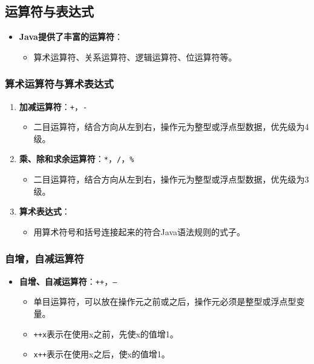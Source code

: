 \documentclass[a4paper, 10pt]{ctexart}
\begin{document}
\subsection{运算符与表达式}
\begin{itemize}
  \item \textbf{Java提供了丰富的运算符}：
  \begin{itemize}
    \item 算术运算符、关系运算符、逻辑运算符、位运算符等。
  \end{itemize}
\end{itemize}

\subsubsection{算术运算符与算术表达式}
\begin{enumerate}
  \item \textbf{加减运算符}：\texttt{+}，\texttt{-}
  \begin{itemize}
    \item 二目运算符，结合方向从左到右，操作元为整型或浮点型数据，优先级为4级。
  \end{itemize}
  \item \textbf{乘、除和求余运算符}：\texttt{*}，\texttt{/}，\texttt{\%}
  \begin{itemize}
    \item 二目运算符，结合方向从左到右，操作元为整型或浮点型数据，优先级为3级。
  \end{itemize}
  \item \textbf{算术表达式}：
  \begin{itemize}
    \item 用算术符号和括号连接起来的符合Java语法规则的式子。
  \end{itemize}
\end{enumerate}

\subsubsection{自增，自减运算符}
\begin{itemize}
  \item \textbf{自增、自减运算符}：\texttt{++}，\texttt{--}
  \begin{itemize}
    \item 单目运算符，可以放在操作元之前或之后，操作元必须是整型或浮点型变量。
    \item \texttt{++x}表示在使用x之前，先使x的值增1。
    \item \texttt{x++}表示在使用x之后，使x的值增1。
  \end{itemize}
\end{itemize}
\end{document}
